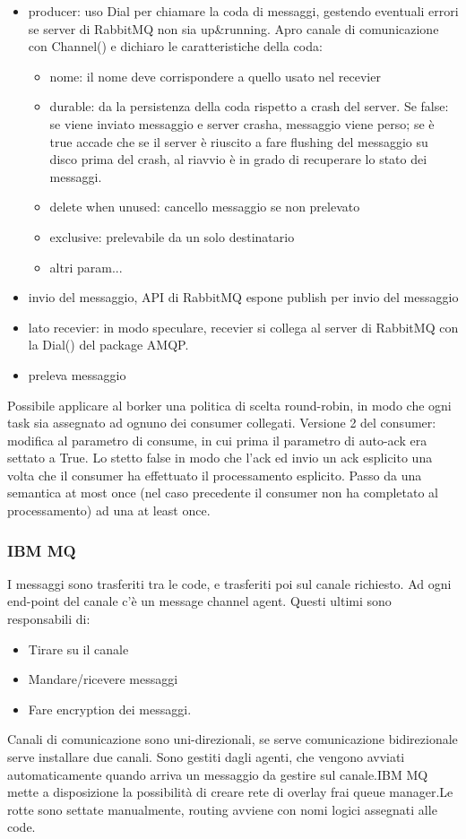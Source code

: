 \documentclass[16px]{article}
\begin{document}
\begin{itemize}
\item producer: uso Dial per chiamare la coda di messaggi, gestendo eventuali errori se server di RabbitMQ non sia up\&running. Apro canale di comunicazione con Channel() e dichiaro le caratteristiche della coda:
\begin{itemize}
\item nome: il nome deve corrispondere a quello usato nel recevier
\item durable: da la persistenza della coda rispetto a crash del server. Se false: se viene inviato messaggio e server crasha, messaggio viene perso; se è true accade che se il server è riuscito a fare flushing del messaggio su disco prima del crash, al riavvio è in grado di recuperare lo stato dei messaggi.
\item delete when unused: cancello messaggio se non prelevato
\item exclusive: prelevabile da un solo destinatario
\item altri param... 
\end{itemize}
\item invio del messaggio, API di RabbitMQ espone publish per invio del messaggio
\item lato recevier: in modo speculare, recevier si collega al server di RabbitMQ con la Dial() del package AMQP.
\item preleva messaggio
\end{itemize}
Possibile applicare al borker una politica di scelta round-robin, in modo che ogni task sia assegnato ad ognuno dei consumer collegati. Versione 2 del consumer: modifica al parametro di consume, in cui prima il parametro di auto-ack era settato a True. Lo stetto false in modo che l'ack ed invio un ack esplicito una volta che il consumer ha effettuato il processamento esplicito. Passo da una semantica at most once (nel caso precedente il consumer non ha completato al processamento) ad una at least once.
\subsubsection{IBM MQ}
I messaggi sono trasferiti tra le code, e trasferiti poi sul canale richiesto. Ad ogni end-point del canale c'è un message channel agent. Questi ultimi sono responsabili di:
\begin{itemize}
\item Tirare su il canale
\item Mandare/ricevere messaggi
\item Fare encryption dei messaggi.
\end{itemize}
Canali di comunicazione sono uni-direzionali, se serve comunicazione bidirezionale serve installare due canali. Sono gestiti dagli agenti, che vengono avviati automaticamente quando arriva un messaggio da gestire sul canale.IBM MQ mette a disposizione la possibilità di creare rete di overlay frai queue manager.Le rotte sono settate manualmente, routing avviene con nomi logici assegnati alle code.
\end{document}

